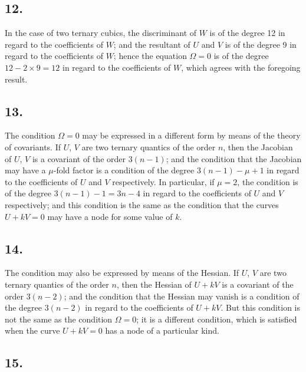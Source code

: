 \documentclass[11pt,a4paper]{article}
\theoremstyle{definition}
\begin{document}
\subsection*{12.}

In the case of two ternary cubics, the discriminant of $W$ is of the degree 12 in regard
to the coefficients of $W$; and the resultant of $U$ and $V$ is of the degree 9 in regard to
the coefficients of $W$; hence the equation $\Omega = 0$ is of the degree $12 - 2 \times 9 = 12$ in regard
to the coefficients of $W$, which agrees with the foregoing result.

\subsection*{13.}

The condition $\Omega = 0$ may be expressed in a different form by means of the theory of
covariants. If $U$, $V$ are two ternary quantics of the order $n$, then the Jacobian of $U$,
$V$ is a covariant of the order $3(n - 1)$; and the condition that the Jacobian may have a
$\mu$-fold factor is a condition of the degree $3(n - 1) - \mu + 1$ in regard to the coefficients of
$U$ and $V$ respectively. In particular, if $\mu = 2$, the condition is of the degree $3(n - 1) - 1 = 3n - 4$
in regard to the coefficients of $U$ and $V$ respectively; and this condition is the same as
the condition that the curves $U + kV = 0$ may have a node for some value of $k$.

\subsection*{14.}

The condition may also be expressed by means of the Hessian. If $U$, $V$ are two
ternary quantics of the order $n$, then the Hessian of $U + kV$ is a covariant of the order
$3(n - 2)$; and the condition that the Hessian may vanish is a condition of the degree
$3(n - 2)$ in regard to the coefficients of $U + kV$. But this condition is not the same as
the condition $\Omega = 0$; it is a different condition, which is satisfied when the curve $U + kV = 0$
has a node of a particular kind.

\newpage
\subsection*{15.}
\end{document}
